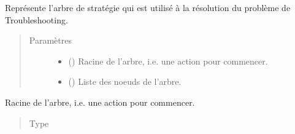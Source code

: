 \documentclass[letterpaper,10pt,french]{sphinxmanual}
\begin{document}
\begin{fulllineitems}
\label{\detokenize{index:StrategyTree.StrategyTree}}
Représente l’arbre de stratégie qui est utilisé à la résolution du problème
de Troubleshooting.
\begin{quote}\begin{description}
\item[{Paramètres}] \leavevmode\begin{itemize}
\item {} 
 ({\hyperref[\detokenize{index:StrategyTree.NodeST}]{}}\sphinxstyleliteralemphasis{\sphinxupquote{, }}) \textendash{} Racine de l’arbre, i.e. une action pour commencer.

\item {} 
 (\sphinxstyleliteralemphasis{\sphinxupquote{)}}\sphinxstyleliteralemphasis{\sphinxupquote{, }}) \textendash{} Liste des noeuds de l’arbre.

\end{itemize}

\end{description}\end{quote}

\begin{fulllineitems}
\label{\detokenize{index:StrategyTree.StrategyTree._root}}
Racine de l’arbre, i.e. une action pour commencer.
\begin{quote}\begin{description}
\item[{Type}] \leavevmode
{\hyperref[\detokenize{index:StrategyTree.NodeST}]{}}

\end{description}\end{quote}


\end{fulllineitems}
\end{fulllineitems}
\end{document}
